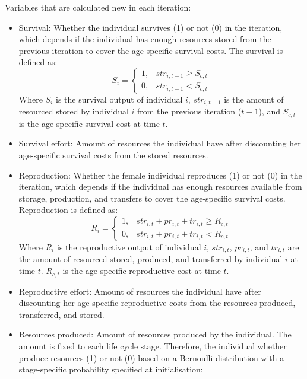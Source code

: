 \documentclass{article}
\begin{document}
Variables that are calculated new in each iteration:
    \begin{itemize}
        \item Survival: Whether the individual survives (1) or not (0) in the iteration, which depends if the individual has enough resources stored from the previous iteration to cover the age-specific survival costs. The survival is defined as:
\begin{equation}
    S_i=\begin{cases}
    1,& str_{i,t-1} \geq S_{c,t}\\
    0,& str_{i,t-1} < S_{c,t}
\end{cases}
\end{equation}
        Where $S_i$ is the survival output of individual $i$, $str_{i,t-1}$ is the amount of resourced stored by individual $i$ from the previous iteration ($t-1$), and $S_{c,t}$ is the age-specific survival cost at time $t$.
        \item Survival effort: Amount of resources the individual have after discounting her age-specific survival costs from the stored resources.
        \item Reproduction: Whether the female individual reproduces (1) or not (0) in the iteration, which depends if the individual has enough resources available from storage, production, and transfers to cover the age-specific survival costs. Reproduction is defined as:
\begin{equation}
    R_i=\begin{cases}
    1,& str_{i,t}+pr_{i,t}+tr_{i,t} \geq R_{c,t}\\
    0,& str_{i,t}+pr_{i,t}+tr_{i,t} < R_{c,t}
\end{cases}
\end{equation}
        Where $R_i$ is the reproductive output of individual $i$, $str_{i,t}$, $pr_{i,t}$, and $tr_{i,t}$ are the amount of resourced stored, produced, and transferred by individual $i$ at time $t$. $R_{c,t}$ is the age-specific reproductive cost at time $t$.
        \item Reproductive effort: Amount of resources the individual have after discounting her age-specific reproductive costs from the resources produced, transferred, and stored.
        \item Resources produced: Amount of resources produced by the individual. The amount is fixed to each life cycle stage. Therefore, the individual whether produce resources (1) or not (0) based on a Bernoulli distribution with a stage-specific probability specified at initialisation:

\end{itemize}
\end{document}
